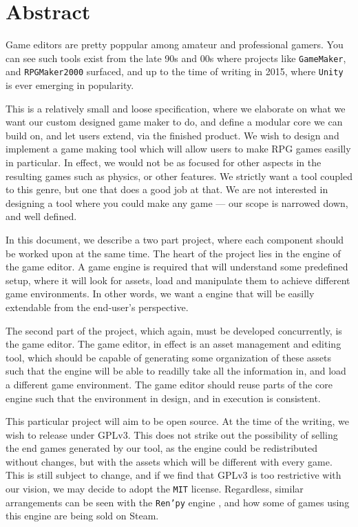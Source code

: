 \section{Abstract}

Game editors are pretty poppular among amateur and professional gamers. You can
see such tools exist from the late 90s and 00s where projects like
\texttt{GameMaker}, and \texttt{RPGMaker2000} surfaced, and up to the time of
writing in 2015, where \texttt{Unity} is ever emerging in popularity.

This is a relatively small and loose specification, where we elaborate on what
we want our custom designed game maker to do, and define a modular core we can
build on, and let users extend, via the finished product. We wish to design and
implement a game making tool which will allow users to make RPG games easilly in
particular. In effect, we would not be as focused for other aspects in the
resulting games such as physics, or other features. We strictly want a tool
coupled to this genre, but one that does a good job at that. We are not
interested in designing a tool where you could make any game --- our scope is
narrowed down, and well defined.

In this document, we describe a two part project, where each component should be
worked upon at the same time. The heart of the project lies in the engine of the
game editor. A game engine is required that will understand some predefined
setup, where it will look for assets, load and manipulate them to achieve
different game environments. In other words, we want a engine that will be
easilly extendable from the end-user's perspective.

The second part of the project, which again, must be developed concurrently, is
the game editor. The game editor, in effect is an asset management and editing
tool, which should be capable of generating some organization of these assets
such that the engine will be able to readilly take all the information in, and
load a different game environment. The game editor should reuse parts of the
core engine such that the environment in design, and in execution is consistent.

This particular project will aim to be open source. At the time of the writing,
we wish to release under GPLv3. This does not strike out the possibility of
selling the end games generated by our tool, as the engine could be
redistributed without changes, but with the assets which will be different with
every game. This is still subject to change, and if we find that GPLv3 is too
restrictive with our vision, we may decide to adopt the \texttt{MIT} license.
Regardless, similar arrangements can be seen with the \texttt{Ren'py} engine
\cite{renpy}, and how some of games using this engine are being sold on Steam.

